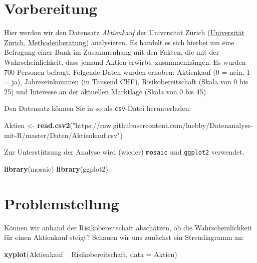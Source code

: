 \documentclass[12pt,ngerman,]{book}
\newenvironment{Shaded}{\begin{snugshade}}{\end{snugshade}}
\newcommand{\KeywordTok}[1]{\textcolor[rgb]{0.13,0.29,0.53}{\textbf{{#1}}}}
\newcommand{\DataTypeTok}[1]{\textcolor[rgb]{0.13,0.29,0.53}{{#1}}}
\newcommand{\StringTok}[1]{\textcolor[rgb]{0.31,0.60,0.02}{{#1}}}
\newcommand{\NormalTok}[1]{{#1}}
\renewenvironment{Shaded}{\begin{kframe}}{\end{kframe}}
\begin{document}
\section{Vorbereitung}\label{vorbereitung}

Hier werden wir den Datensatz \emph{Aktienkauf} der Universität Zürich
(\href{http://www.methodenberatung.uzh.ch/de/datenanalyse/zusammenhaenge/lreg.html}{Universität
Zürich, Methodenberatung}) analysieren. Es handelt es sich hierbei um
eine Befragung einer Bank im Zusammenhang mit den Fakten, die mit der
Wahrscheinlichkeit, dass jemand Aktien erwirbt, zusammenhängen. Es
wurden 700 Personen befragt. Folgende Daten wurden erhoben: Aktienkauf
(0 = nein, 1 = ja), Jahreseinkommen (in Tausend CHF), Risikobereitschaft
(Skala von 0 bis 25) und Interesse an der aktuellen Marktlage (Skala von
0 bis 45).

Den Datensatz können Sie in so als \texttt{csv}-Datei herunterladen:

\begin{Shaded}
\begin{Highlighting}[]
\NormalTok{Aktien <-}\StringTok{ }\KeywordTok{read.csv2}\NormalTok{(}\StringTok{"https://raw.githubusercontent.com/luebby/Datenanalyse-mit-R/master/Daten/Aktienkauf.csv"}\NormalTok{)}
\end{Highlighting}
\end{Shaded}

Zur Unterstützung der Analyse wird (wieder) \texttt{mosaic} und
\texttt{ggplot2} verwendet.

\begin{Shaded}
\begin{Highlighting}[]
\KeywordTok{library}\NormalTok{(mosaic)}
\KeywordTok{library}\NormalTok{(ggplot2)}
\end{Highlighting}
\end{Shaded}

\section{Problemstellung}\label{problemstellung}

Können wir anhand der Risikobereitschaft abschätzen, ob die
Wahrscheinlichkeit für einen Aktienkauf steigt? Schauen wir uns zunächst
ein Streudiagramm an:

\begin{Shaded}
\begin{Highlighting}[]
\KeywordTok{xyplot}\NormalTok{(Aktienkauf ~}\StringTok{ }\NormalTok{Risikobereitschaft, }\DataTypeTok{data =} \NormalTok{Aktien)}
\end{Highlighting}
\end{Shaded}
\end{document}

